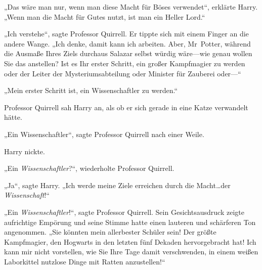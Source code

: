 „Das wäre man nur, wenn man diese Macht für Böses verwendet“, erklärte Harry. „Wenn man die Macht für Gutes nutzt, ist man ein Heller Lord.“

„Ich verstehe“, sagte Professor Quirrell. Er tippte sich mit einem Finger an die andere Wange. „Ich denke, damit kann ich arbeiten. Aber, Mr~Potter, während die Ausmaße Ihres Ziels durchaus Salazar selbst würdig wäre—wie genau wollen Sie das anstellen? Ist es Ihr erster Schritt, ein großer Kampfmagier zu werden oder der Leiter der Mysteriumsabteilung oder Minister für Zauberei oder—“

„Mein erster Schritt ist, ein Wissenschaftler zu werden.“

Professor Quirrell sah Harry an, als ob er sich gerade in eine Katze verwandelt hätte.

„Ein Wissenschaftler“, sagte Professor Quirrell nach einer Weile.

Harry nickte.

„Ein \emph{Wissenschaftler}?“, wiederholte Professor Quirrell.

„Ja“, sagte Harry. „Ich werde meine Ziele erreichen durch die Macht…der \emph{Wissenschaft}!“

„Ein \emph{Wissenschaftler}!“, sagte Professor Quirrell. Sein Gesichtsausdruck zeigte aufrichtige Empörung und seine Stimme hatte einen lauteren und schärferen Ton angenommen. „Sie könnten mein allerbester Schüler sein! Der größte Kampfmagier, den Hogwarts in den letzten fünf Dekaden hervorgebracht hat! Ich kann mir nicht vorstellen, wie Sie Ihre Tage damit verschwenden, in einem weißen Laborkittel nutzlose Dinge mit Ratten anzustellen!“

